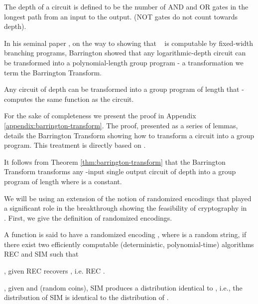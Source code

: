\begin{definition}
The depth of a circuit is defined to be the number of AND and OR gates
in the  longest path from  an input to  the output. (NOT gates  do not
count towards depth).
\end{definition}

In his seminal paper \cite{B89}, on the way to showing that \NCone~ is
computable by  fixed-width branching programs,  Barrington showed that
any   logarithmic-depth   circuit    can   be   transformed   into   a
polynomial-length  group  program  -  a  transformation  we  term  the
Barrington Transform.

\begin{theorem} 
\label{thm:barrington-transform}
Any circuit  of depth  can be
  transformed   into  a   group   program  of   length     that
  -computes the same function as the circuit.
\end{theorem}

For  the  sake  of  completeness  we present  the  proof  in  Appendix
\ref{appendix:barrington-transform}.   The  proof,  presented  as  a  series  of
lemmas, details  the Barrington Transform  showing how to  transform a
circuit  into a  group program.  This  treatment is  directly based  on
\cite{Viola09}.

It  follows  from   Theorem  \ref{thm:barrington-transform}  that  the
Barrington Transform transforms any -input single output circuit of
depth  into a group program of length  where
 is a  constant.  

We will  be using an extension  of the notion  of randomized encodings
\cite{IK00,  AIK05,  A11}  that  played  a  significant  role  in  the
breakthrough  showing  the  feasibility  of cryptography  in  \NCzero~
\cite{AIK04}.  First, we give the definition of randomized encodings.

\begin{definition} 
A   function     is   said  to   have   a  randomized   encoding
,  where   is a  random  string, if  there exist  two
efficiently computable (deterministic, polynomial-time) algorithms REC
and SIM such that

 , given   REC
recovers , i.e. REC .

  ,  given   and    (random
coins), SIM produces a distribution identical to , i.e.,
the distribution of  SIM is identical to  the distribution of
.

\end{definition}

